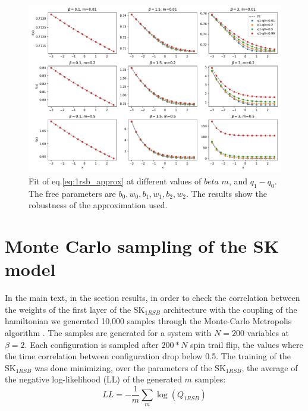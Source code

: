 \documentclass[10pt, notitlepage]{revtex4-2}
\begin{document}
\begin{figure}[h]
    \centering
    \includegraphics[width=1\textwidth]{img/fit_1rsb.pdf}
    \caption{Fit of eq.\ref{eq:1rsb_approx} at different values of $beta$ $m$, and $q_1 - q_0$. The free parameters are $b_0, w_0, b_1, w_1, b_2, w_2$. The results show the robustness of the approximation used. }
    \label{fig:1rsb_approx}
\end{figure}


\section{Monte Carlo sampling of the SK model}
In the main text, in the section results, in order to check the correlation between the weights of the first layer of the SK$_{1RSB}$ architecture with the coupling of the hamiltonian we generated 10,000 samples through the Monte-Carlo Metropolis algorithm \cite{doi:10.1063/1.1887186}. The samples are generated for a system with $N=200$ variables at $\beta=2$. Each configuration is sampled after $200*N$ spin trail flip, the values where the time correlation between configuration drop below 0.5. The training of the SK$_{1RSB}$ was done minimizing, over the parameters of the SK$_{1RSB}$, the average of the negative log-likelihood (LL) of the generated $m$ samples:
\begin{equation}
    LL = - \frac{1}{m} \sum_{m}\log(Q_{1RSB})
\end{equation}  
\end{document}
